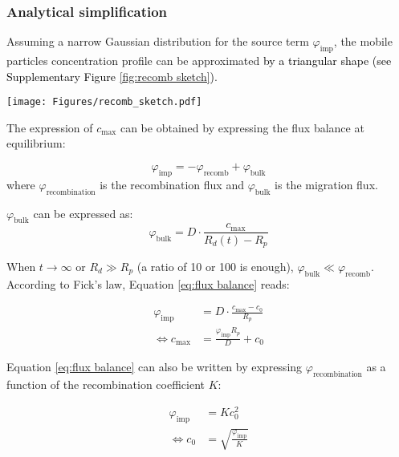 \subsubsection{Analytical simplification}
Assuming a narrow Gaussian distribution for the source term $\varphi_\mathrm{imp}$, the mobile particles concentration profile can be approximated \textcolor{black}{by a triangular shape\cite{schmid_diffusion-trapping_2016} (see Supplementary Figure \ref{fig:recomb sketch})}.

\begin{figure*}[h!]
    \centering
    \texttt{[image: Figures/recomb\_sketch.pdf]}
    \caption{Concentration profile with recombination flux and volumetric source term at $x=R_p$. Dashed lines correspond to time evolution.}
    \label{fig:recomb sketch}
\end{figure*}

The expression of $c_\mathrm{max}$ can be obtained by expressing the flux balance at equilibrium:

\begin{equation}
    \varphi_\mathrm{imp} = -\varphi_\mathrm{recomb} + \varphi_\mathrm{bulk}
    \label{eq:flux balance}
\end{equation}
where $\varphi_\mathrm{recombination}$ is the recombination flux and $\varphi_\mathrm{bulk}$ is the migration flux.

$\varphi_\mathrm{bulk}$ can be expressed as:
\begin{equation}
    \varphi_\mathrm{bulk} = D \cdot \frac{c_\mathrm{max}}{R_d(t) - R_p}
\end{equation}

When $t \rightarrow \infty$ or $R_d \gg R_p$ (a ratio of 10 or 100 is enough), $\varphi_\mathrm{bulk} \ll \varphi_\mathrm{recomb}$.
According to Fick's law, Equation \ref{eq:flux balance} reads:

\begin{eqnarray}
    \varphi_\mathrm{imp} &= D \cdot \frac{c_\mathrm{max}-c_{0}}{R_{p}} \\
    \Leftrightarrow c_\mathrm{max} &= \frac{\varphi_\mathrm{imp} R_{p}}{D}+ c_0
    \label{eq:c_max}
\end{eqnarray}

Equation \ref{eq:flux balance} can also be written by expressing $\varphi_\mathrm{recombination}$ as a function of the recombination coefficient $K$:

\begin{eqnarray}
    \varphi_\mathrm{imp} &= K c_{0}^{2} \\
    \Leftrightarrow c_{0} &= \sqrt{\frac{\varphi_\mathrm{imp}}{K}}
    \label{eq:c_0}
\end{eqnarray}

